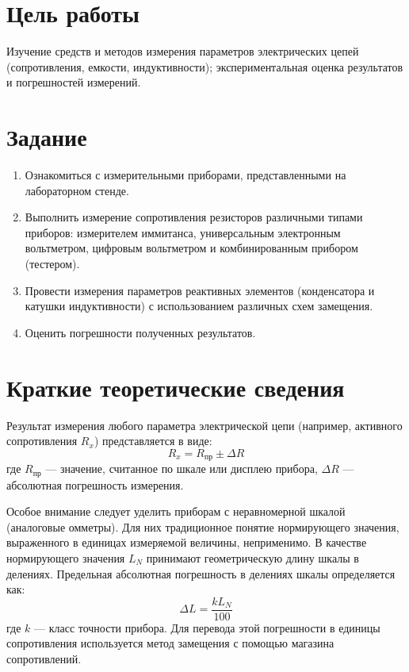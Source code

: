 \section*{Цель работы}
Изучение средств и методов измерения параметров электрических цепей (сопротивления, емкости, индуктивности); экспериментальная оценка результатов и погрешностей измерений.

\section*{Задание}
\begin{enumerate}
    \item Ознакомиться с измерительными приборами, представленными на лабораторном стенде.
    \item Выполнить измерение сопротивления резисторов различными типами приборов: измерителем иммитанса, универсальным электронным вольтметром, цифровым вольтметром и комбинированным прибором (тестером).
    \item Провести измерения параметров реактивных элементов (конденсатора и катушки индуктивности) с использованием различных схем замещения.
    \item Оценить погрешности полученных результатов.
\end{enumerate}

\section*{Краткие теоретические сведения}
Результат измерения любого параметра электрической цепи (например, активного сопротивления $R_x$) представляется в виде:
\begin{equation}
    R_x = R_{\text{пр}} \pm \Delta R
\end{equation}
где $R_{\text{пр}}$ --- значение, считанное по шкале или дисплею прибора, $\Delta R$ --- абсолютная погрешность измерения.

Особое внимание следует уделить приборам с неравномерной шкалой (аналоговые омметры). Для них традиционное понятие нормирующего значения, выраженного в единицах измеряемой величины, неприменимо. В качестве нормирующего значения $L_N$ принимают геометрическую длину шкалы в делениях. Предельная абсолютная погрешность в делениях шкалы определяется как:
\begin{equation}
    \Delta L = \frac{k L_N}{100}
\end{equation}
где $k$ --- класс точности прибора. Для перевода этой погрешности в единицы сопротивления используется метод замещения с помощью магазина сопротивлений.

